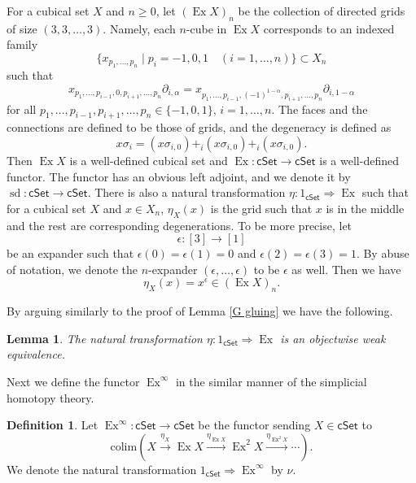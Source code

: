 \documentclass[oneside, 12pt]{amsart}
\numberwithin{equation}{section}
\theoremstyle{plain}
\newtheorem{lemma}[theorem]{Lemma}
\theoremstyle{definition}
\newtheorem{definition}[theorem]{Definition}
\theoremstyle{remark}
\newcommand{\cSet}{\mathsf{cSet}}
\newcommand{\sd}{\operatorname{sd}}
\newcommand{\ex}{\operatorname{Ex}}
\begin{document}
	
	For a cubical set $X$ and $n\ge0$, let $(\ex X)_n$ be the collection of directed grids of size $(3,3,\ldots,3)$. Namely, each $n$-cube in $\ex X$ corresponds to an indexed family
	\[
	\{x_{p_1,\ldots,p_n}\mid p_i=-1,0,1\quad(i=1,\ldots,n)\}\subset X_n
	\]
	such that 
	\begin{equation}
		\label{ex formula}
		x_{p_1,\ldots,p_{i-1},0,p_{i+1},\ldots,p_n}\partial_{i,\alpha}=x_{p_1,\ldots,p_{i-1},(-1)^{1-\alpha},p_{i+1},\ldots,p_n}\partial_{i,1-\alpha}
	\end{equation}
	for all $p_1,\ldots,p_{i-1},p_{i+1},\ldots,p_n\in\{-1,0,1\}$, $i=1,\ldots,n$. The faces and the connections are defined to be those of grids, and the degeneracy is defined as
	\[
	x\sigma_i=(x\sigma_{i,0})+_i(x\sigma_{i,0})+_i(x\sigma_{i,0}).
	\]
	Then $\ex X$ is a well-defined cubical set and $\ex\colon\cSet\to\cSet$ is a well-defined functor. The functor has an obvious left adjoint, and we denote it by $\sd\colon\cSet\to\cSet$. There is also a natural transformation $\eta\colon1_{\cSet}\Rightarrow\ex$ such that for a cubical set $X$ and $x\in X_n$, $\eta_X(x)$ is the grid such that $x$ is in the middle and the rest are corresponding degenerations. To be more precise, let 
	\[
	\epsilon\colon[3]\to[1]
	\]
	be an expander such that $\epsilon(0)=\epsilon(1)=0$ and $\epsilon(2)=\epsilon(3)=1$. By abuse of notation, we denote the $n$-expander $(\epsilon,\ldots,\epsilon)$ to be $\epsilon$ as well. Then we have
	\begin{equation}
		\label{ex expander}
		\eta_X(x)=x^\epsilon\in(\ex X)_n.
	\end{equation}
	
	By arguing similarly to the proof of Lemma \ref{G gluing} we have the following. 
	\begin{lemma}
		\label{ex weak equivalence}
		The natural transformation $\eta\colon1_{\cSet}\Rightarrow\ex$ is an objectwise weak equivalence.
	\end{lemma}
	Next we define the functor $\ex^\infty$ in the similar manner of the simplicial homotopy theory.
	\begin{definition}
		Let $\ex^\infty\colon\cSet\to\cSet$ be the functor sending $X\in\cSet$ to 
		\[
		\mathrm{colim}(X\xrightarrow{\eta_X}\ex X\xrightarrow{\eta_{\ex X}}\ex^2 X\xrightarrow{\eta_{\ex^2X}}\cdots).
		\]
		We denote the natural transformation $1_{\cSet}\Rightarrow\ex^\infty$ by $\nu$.
	\end{definition}
	
\end{document}
